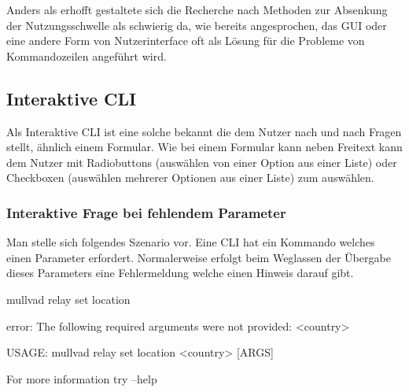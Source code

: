 \documentclass[oneside,bibliography=totocnumbered,BCOR=5mm]{scrbook}
\newenvironment{code}{\captionsetup{type=listing, skip=0pt}}{}
\begin{document}
\newcommand{\methbox}[2]{
  \fbox{\parbox{\linewidth}{
    \refstepcounter{meth}
    \textbf{Methode~\themeth}: #2
    \label{meth:#1}
  }}
}
\newcommand{\methref}[1]{
  Methode~\ref{meth:#1}
}

Anders als erhofft gestaltete sich die Recherche nach Methoden zur Absenkung
der Nutzungsschwelle als schwierig da, wie bereits angesprochen, das GUI oder
eine andere Form von Nutzerinterface oft als Lösung für die Probleme von
Kommandozeilen angeführt wird.




\subsection{Interaktive CLI}

Als Interaktive CLI ist eine solche bekannt die dem Nutzer nach und nach Fragen
stellt, ähnlich einem Formular. Wie bei einem Formular kann neben Freitext kann
dem Nutzer mit Radiobuttons (auswählen von einer Option aus einer Liste) oder
Checkboxen (auswählen mehrerer Optionen aus einer Liste) zum auswählen. %



\subsubsection{Interaktive Frage bei fehlendem Parameter}

Man stelle sich folgendes Szenario vor. Eine CLI hat ein Kommando welches einen Parameter erfordert.
Normalerweise erfolgt beim Weglassen der Übergabe dieses Parameters eine Fehlermeldung welche einen Hinweis darauf gibt.

\begin{code}
  \begin{shellcode}
mullvad relay set location

error: The following required arguments were not provided:
    <country>

USAGE:
    mullvad relay set location <country> [ARGS]

For more information try --help
  \end{shellcode}
  \medskip
\end{code}
\end{document}
